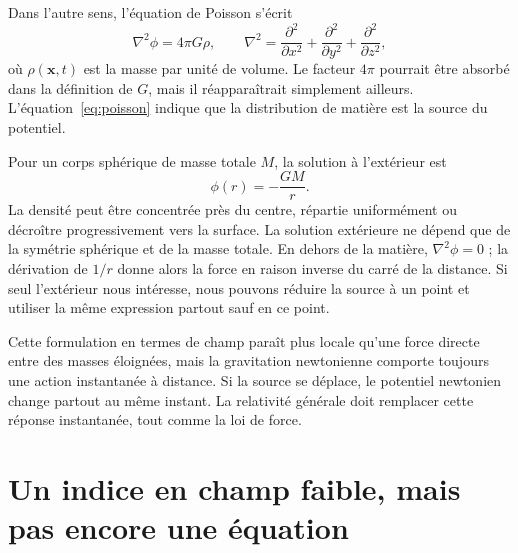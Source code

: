 Dans l’autre sens, l’équation de Poisson s’écrit
\begin{equation}
 \nabla^2\phi=4\pi G\rho,
 \qquad
 \nabla^2=
 \frac{\partial^2}{\partial x^2}
 +\frac{\partial^2}{\partial y^2}
 +\frac{\partial^2}{\partial z^2},
 \label{eq:poisson}
\end{equation}
où \(\rho(\mathbf{x},t)\) est la masse par unité de volume. Le facteur \(4\pi\) pourrait être absorbé dans la définition de \(G\), mais il réapparaîtrait simplement ailleurs. L’équation~\eqref{eq:poisson} indique que la distribution de matière est la source du potentiel.

Pour un corps sphérique de masse totale \(M\), la solution à l’extérieur est
\begin{equation}
 \phi(r)=-\frac{GM}{r}.
 \label{eq:newton-potential}
\end{equation}
La densité peut être concentrée près du centre, répartie uniformément ou décroître progressivement vers la surface. La solution extérieure ne dépend que de la symétrie sphérique et de la masse totale. En dehors de la matière,
\(\nabla^2\phi=0\) ; la dérivation de \(1/r\) donne alors la force en raison inverse du carré de la distance. Si seul l’extérieur nous intéresse, nous pouvons réduire la source à un point et utiliser la même expression partout sauf en ce point.

\begin{classroomqa}
\end{classroomqa}

Cette formulation en termes de champ paraît plus locale qu’une force directe entre des masses éloignées, mais la gravitation newtonienne comporte toujours une action instantanée à distance. Si la source se déplace, le potentiel newtonien change partout au même instant. La relativité générale doit remplacer cette réponse instantanée, tout comme la loi de force.

\section{Un indice en champ faible, mais pas encore une équation}

